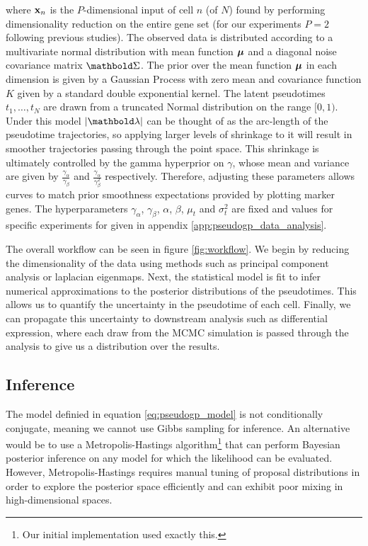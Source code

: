 where ${\bf x}_{n}$ is the $P$-dimensional input of cell $n$ (of $N$) found by performing dimensionality reduction on the entire gene set (for our experiments $P=2$ following previous studies).
The observed data is distributed according to a multivariate normal distribution with mean function ${\bm \mu}$ and a diagonal noise covariance matrix $\mbSigma$. The prior over the mean function ${\bm \mu}$ in each dimension is given by a Gaussian Process with zero mean and covariance function $K$ given by a standard double exponential kernel. The latent pseudotimes $t_1, \dots, t_N$ are drawn from a truncated Normal distribution on the range $[0, 1)$. Under this model $|\mblambda|$ can be thought of as the arc-length of the pseudotime trajectories, so applying larger levels of shrinkage to it will result in smoother trajectories passing through the point space. This shrinkage is ultimately controlled by the gamma hyperprior on $\gamma$, whose mean and variance are given by $\frac{\gamma_\alpha}{\gamma_\beta}$ and $\frac{\gamma_\alpha}{\gamma^2_\beta}$ respectively. Therefore, adjusting these parameters allows curves to match prior smoothness expectations provided by plotting marker genes. The hyperparameters $\gamma_\alpha$, $\gamma_\beta$, $\alpha$, $\beta$, $\mu_t$ and $\sigma_t^2$ are fixed and values for specific experiments for given in appendix \ref{app:pseudogp_data_analysis}.


The overall workflow can be seen in figure \ref{fig:workflow}. We begin by reducing the dimensionality of the data using methods such as principal component analysis or laplacian eigenmaps. Next, 	the statistical model is fit to infer numerical approximations to the posterior distributions of the pseudotimes. This allows us to quantify the uncertainty in the pseudotime of each cell. Finally, we can propagate this uncertainty to downstream analysis such as differential expression, where each draw from the MCMC simulation is passed through the analysis to give us a distribution over the results.

\subsection{Inference} \label{sec:stan}

The model definied in equation \ref{eq:pseudogp_model} is not conditionally conjugate, meaning we cannot use Gibbs sampling for inference. An alternative would be to use a Metropolis-Hastings algorithm\footnote{
Our initial implementation used exactly this.
} that can perform Bayesian posterior inference on any model for which the likelihood can be evaluated. However, Metropolis-Hastings requires manual tuning of proposal distributions in order to explore the posterior space efficiently and can exhibit poor mixing in high-dimensional spaces.

